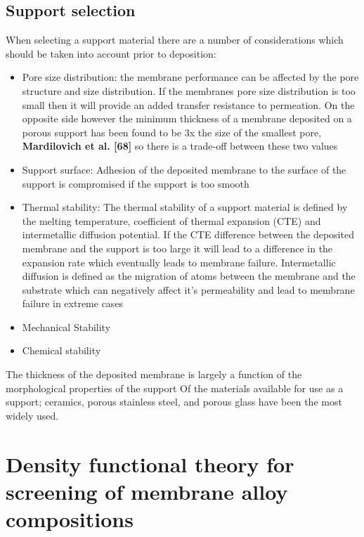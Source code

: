 \subsection{Support selection}
When selecting a support material there are a number of considerations which should be taken 
into account prior to deposition:
\begin{itemize}
\item Pore size distribution: the membrane performance can be affected by the pore structure 
and size distribution. If the membranes pore size distribution is too small then it will 
provide an added transfer resistance to permeation. On the opposite side however the minimum 
thickness of a membrane deposited on a porous support has been found to be 3x the size of the 
smallest pore, \textbf{Mardilovich et al. [68]}  so there is a trade-off between these two 
values
\item Support surface: Adhesion of the deposited membrane to the surface of the support is 
compromised if the support is too smooth
\item Thermal stability: The thermal stability of a support material is defined by the 
melting temperature, coefficient of thermal expansion (CTE) and intermetallic diffusion 
potential. If the CTE difference between the deposited membrane and the support is too large 
it will lead to a difference in the expansion rate which eventually leads to membrane failure. Intermetallic diffusion is defined as the migration of atoms between the membrane and the substrate which can negatively affect it’s permeability and lead to membrane failure in extreme cases
\item Mechanical Stability
\item Chemical stability
\end{itemize}
The thickness of the deposited membrane is largely a function of the morphological properties 
of the support 
Of the materials available for use as a support; ceramics, porous stainless steel, and porous 
glass have been the most widely used. 


\section{Density functional theory for screening of membrane alloy compositions}






